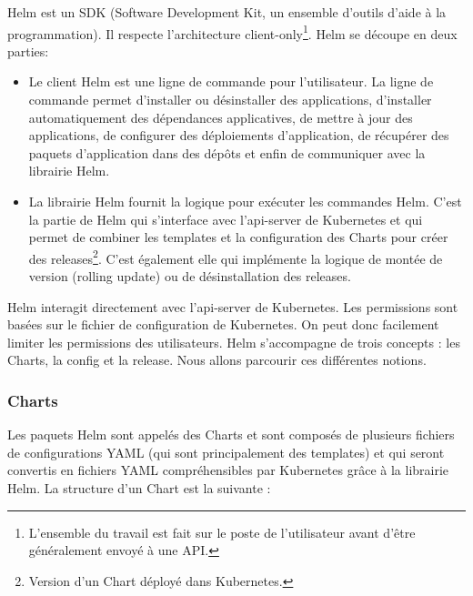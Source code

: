 \documentclass[11pt,fleqn]{book} %
\begin{document}
Helm est un SDK (Software Development Kit, un ensemble d’outils d’aide à la programmation). Il respecte l'architecture client-only\footnote{L'ensemble du travail est fait sur le poste de l'utilisateur avant d'être généralement envoyé à une API.}. Helm se découpe en deux parties:
\begin{itemize}
    \item Le client Helm est une ligne de commande pour l'utilisateur. La ligne de commande permet d'installer ou désinstaller des applications, d'installer automatiquement des dépendances applicatives, de mettre à jour des applications, de configurer des déploiements d'application, de récupérer des paquets d'application dans des dépôts et enfin de communiquer avec la librairie Helm.
    \item La librairie Helm fournit la logique pour exécuter les commandes Helm. C'est la partie de Helm qui s'interface avec l'api-server de Kubernetes et qui permet de combiner les templates et la configuration des Charts pour créer des releases\footnote{Version d'un Chart déployé dans Kubernetes.}. C'est également elle qui implémente la logique de montée de version (rolling update) ou de désinstallation des releases.\\
\end{itemize}

Helm interagit directement avec l'api-server de Kubernetes. Les permissions sont basées sur le fichier de configuration de Kubernetes. On peut donc facilement limiter les permissions des utilisateurs. Helm s'accompagne de trois concepts : les Charts, la config et la release. Nous allons parcourir ces différentes notions.

\subsubsection{Charts}
Les paquets Helm sont appelés des Charts et sont composés de plusieurs fichiers de configurations YAML (qui sont principalement des templates) et qui seront convertis en fichiers YAML compréhensibles par Kubernetes grâce à la librairie Helm. La structure d'un Chart est la suivante :
\end{document}
